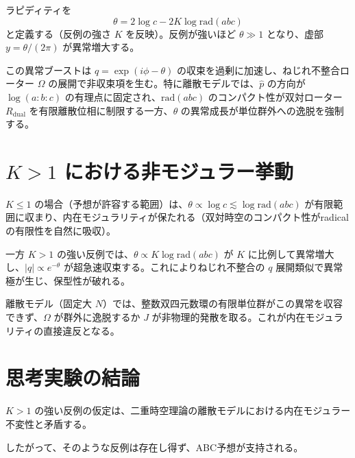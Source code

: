 \documentclass[a4paper]{article}
\begin{document}
ラピディティを
\[
\theta = 2 \log c - 2 K \log \mathrm{rad}(abc)
\]
と定義する（反例の強さ $K$ を反映）。反例が強いほど $\theta \gg 1$ となり、虚部 $y = \theta/(2\pi)$ が異常増大する。

この異常ブーストは $q = \exp(i \phi - \theta)$ の収束を過剰に加速し、ねじれ不整合ローター $\Omega$ の展開で非収束項を生む。特に離散モデルでは、$\hat{p}$ の方向が $\log(a:b:c)$ の有理点に固定され、$\mathrm{rad}(abc)$ のコンパクト性が双対ローター $R_\text{dual}$ を有限離散位相に制限する一方、$\theta$ の異常成長が単位群外への逸脱を強制する。

\section{$K > 1$ における非モジュラー挙動}

$K \leq 1$ の場合（予想が許容する範囲）は、$\theta \propto \log c \lesssim \log \mathrm{rad}(abc)$ が有限範囲に収まり、内在モジュラリティが保たれる（双対時空のコンパクト性がradicalの有限性を自然に吸収）。

一方 $K > 1$ の強い反例では、$\theta \propto K \log \mathrm{rad}(abc)$ が $K$ に比例して異常増大し、$|q| \propto e^{-\theta}$ が超急速収束する。これによりねじれ不整合の $q$ 展開類似で異常極が生じ、保型性が破れる。

離散モデル（固定大 $N$）では、整数双四元数環の有限単位群がこの異常を収容できず、$\Omega$ が群外に逸脱するか $J$ が非物理的発散を取る。これが内在モジュラリティの直接違反となる。

\section{思考実験の結論}

$K > 1$ の強い反例の仮定は、二重時空理論の離散モデルにおける内在モジュラー不変性と矛盾する。

したがって、そのような反例は存在し得ず、ABC予想が支持される。
\end{document}
